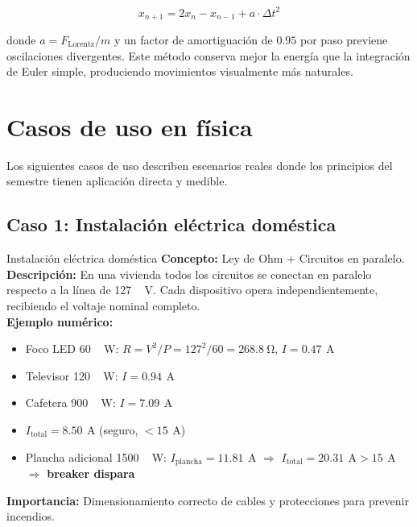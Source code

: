\documentclass[12pt, a4paper]{article}
\newcommand{\V}{\,\si{\volt}}
\newcommand{\A}{\,\si{\ampere}}
\newcommand{\W}{\,\si{\watt}}
\begin{document}
\begin{equation}
  x_{n+1} = 2x_n - x_{n-1} + a \cdot \Delta t^2
  \label{eq:verlet}
\end{equation}

donde $a = F_{\mathrm{Lorentz}} / m$ y un factor de amortiguación de $0.95$
por paso previene oscilaciones divergentes. Este método conserva mejor la
energía que la integración de Euler simple, produciendo movimientos
visualmente más naturales.

\section{Casos de uso en física}

Los siguientes casos de uso describen escenarios reales donde los
principios del semestre tienen aplicación directa y medible.

\subsection{Caso 1: Instalación eléctrica doméstica}

\begin{casodeuso}{Instalación eléctrica doméstica}
\textbf{Concepto:} Ley de Ohm + Circuitos en paralelo.\\[4pt]
\textbf{Descripción:} En una vivienda todos los circuitos se conectan en
paralelo respecto a la línea de \SI{127}{\V}. Cada dispositivo opera
independientemente, recibiendo el voltaje nominal completo.\\[4pt]
\textbf{Ejemplo numérico:}
\begin{itemize}
  \item Foco LED \SI{60}{\W}: $R = V^2/P = 127^2/60 = \SI{268.8}{\ohm}$, $I = \SI{0.47}{\A}$
  \item Televisor \SI{120}{\W}: $I = \SI{0.94}{\A}$
  \item Cafetera \SI{900}{\W}: $I = \SI{7.09}{\A}$
  \item $I_{\mathrm{total}} = \SI{8.50}{\A}$ (seguro, $< \SI{15}{\A}$)
  \item Plancha adicional \SI{1500}{\W}: $I_{\mathrm{plancha}} = \SI{11.81}{\A}$ $\Rightarrow$ $I_{\mathrm{total}} = \SI{20.31}{\A} > \SI{15}{\A}$ $\Rightarrow$ \textbf{breaker dispara}
\end{itemize}
\textbf{Importancia:} Dimensionamiento correcto de cables y protecciones para prevenir incendios.
\end{casodeuso}
\end{document}
